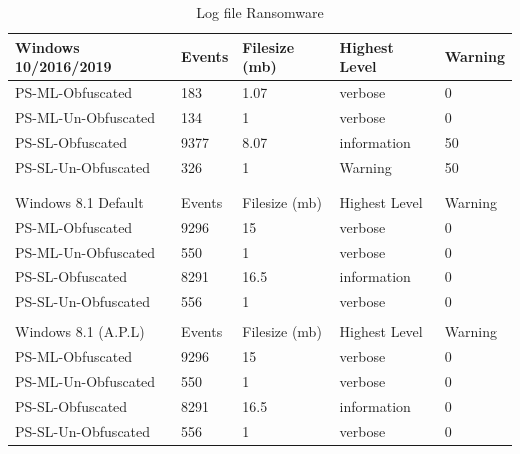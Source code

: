 \documentclass{article}%
\begin{document}
\begin{table}[]
\caption {Log file Ransomware}
\label{tab:table_eight}
\begin{center}
\begin{tabular}{|l|l|l|l|l|}
\hline
Windows 10/2016/2019 & Events & Filesize (mb) & Highest Level & Warning \\\hline
PS-ML-Obfuscated     & 183    & 1.07            & verbose       & 0       \\\hline
PS-ML-Un-Obfuscated  & 134    & 1               & verbose       & 0       \\\hline
PS-SL-Obfuscated     & 9377   & 8.07            & information   & 50      \\\hline
PS-SL-Un-Obfuscated  & 326    & 1               & Warning       & 50      \\\hline
                     &        &                 &               &         \\\hline
                     &        &                 &               &         \\\hline
Windows 8.1 Default  & Events & Filesize (mb) & Highest Level & Warning \\\hline
PS-ML-Obfuscated     & 9296   & 15              & verbose       & 0       \\\hline
PS-ML-Un-Obfuscated  & 550    & 1               & verbose       & 0       \\\hline
PS-SL-Obfuscated     & 8291   & 16.5            & information   & 0       \\\hline
PS-SL-Un-Obfuscated  & 556    & 1               & verbose       & 0       \\\hline
                     &        &                 &               &         \\\hline
Windows 8.1 (A.P.L)  & Events & Filesize (mb) & Highest Level & Warning \\\hline
PS-ML-Obfuscated     & 9296   & 15              & verbose       & 0       \\\hline
PS-ML-Un-Obfuscated  & 550    & 1               & verbose       & 0       \\\hline
PS-SL-Obfuscated     & 8291   & 16.5            & information   & 0       \\\hline
PS-SL-Un-Obfuscated  & 556    & 1               & verbose       & 0       \\\hline
\end{tabular}
\end{center}
\end{table}
\end{document}
